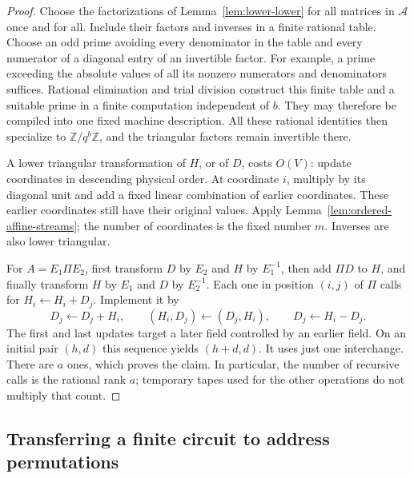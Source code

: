 \documentclass[11pt]{article}
\theoremstyle{definition}
\begin{document}
\begin{proof}
Choose the factorizations of Lemma~\ref{lem:lower-lower} for all matrices
in $\mathcal A$ once and for all.  Include their factors and inverses in
a finite rational table.  Choose an odd prime avoiding every denominator
in the table and every numerator of a diagonal entry of an invertible
factor.  For example, a prime exceeding the absolute values of all its
nonzero numerators and denominators suffices.  Rational elimination and
trial division construct this finite table and a suitable prime in a
finite computation independent of $b$.  They may therefore be compiled
into one fixed machine description.  All these
rational identities then specialize to $\mathbb Z/q^b\mathbb Z$, and
the triangular factors remain invertible there.

A lower triangular transformation of $H$, or of $D$, costs $O(V)$:
update coordinates in descending physical order.  At coordinate $i$,
multiply by its diagonal unit and add a fixed linear combination of
earlier coordinates.  These earlier coordinates still have their original
values.  Apply Lemma~\ref{lem:ordered-affine-streams}; the number of
coordinates is the fixed number $m$.  Inverses are also lower triangular.

For $A=E_1\Pi E_2$, first transform $D$ by $E_2$ and $H$ by $E_1^{-1}$,
then add $\Pi D$ to $H$, and finally transform $H$ by $E_1$ and $D$ by
$E_2^{-1}$.  Each one in position $(i,j)$ of $\Pi$ calls for
$H_i\leftarrow H_i+D_j$.  Implement it by
\[
 D_j\leftarrow D_j+H_i,\qquad
 (H_i,D_j)\leftarrow(D_j,H_i),\qquad
 D_j\leftarrow H_i-D_j.
\]
The first and last updates target a later field controlled by an earlier
field.  On an initial pair $(h,d)$ this sequence yields $(h+d,d)$.
It uses just one interchange.  There are $a$ ones, which proves the
claim.  In particular, the number of recursive calls is the rational
rank $a$; temporary tapes used for the other operations do not multiply
that count.
\end{proof}

\subsection{Transferring a finite circuit to address permutations}
\end{document}
